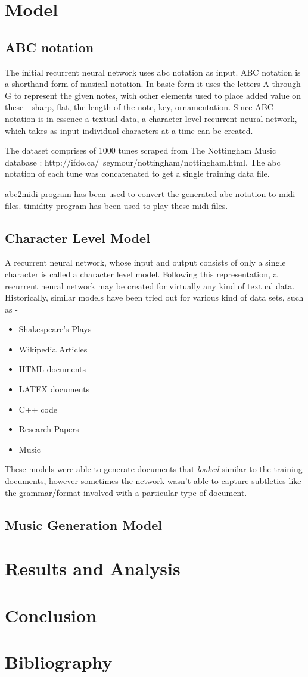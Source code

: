 \documentclass[11pt]{article}
\begin{document}
\section{Model}
\subsection{ABC notation}
The initial recurrent neural network uses abc notation as input. ABC notation is a shorthand form of musical notation. In basic form it uses the letters A through G to represent the given notes, with other elements used to place added value on these - sharp, flat, the length of the note, key, ornamentation. Since ABC notation is in essence a textual data, a character level recurrent neural network, which takes as input individual characters at a time can be created.

The dataset comprises of 1000 tunes scraped from The Nottingham Music database : http://ifdo.ca/~seymour/nottingham/nottingham.html. The abc notation of each tune was concatenated to get a single training data file.

abc2midi program has been used to convert the generated abc notation to midi files. timidity program has been used to play these midi files.

\subsection{Character Level Model}
A recurrent neural network, whose input and output consists of only a single character is called a character level model. Following this representation, a recurrent neural network may be created for virtually any kind of textual data. Historically, similar models have been tried out for various kind of data sets, such as -
\begin{itemize}
\item Shakespeare's Plays
\item Wikipedia Articles
\item HTML documents
\item LATEX documents
\item C++ code
\item Research Papers
\item Music
\end{itemize}

These models were able to generate documents that \emph{looked} similar to the training documents, however sometimes the network wasn't able to capture subtleties like the grammar/format involved with a particular type of document.

\subsection{Music Generation Model}


\section{Results and Analysis}
\section{Conclusion}
\section{Bibliography}
\end{document}
